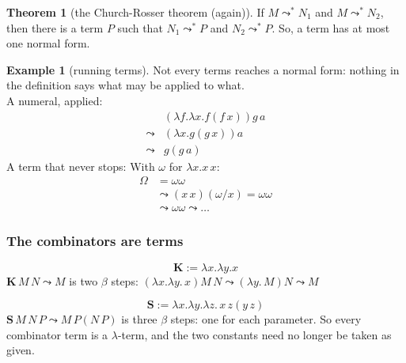 \documentclass[a4paper, 11pt]{article}
\theoremstyle{definition}
\newtheorem{example}[definition]{Example}
\newtheorem{theorem}[definition]{Theorem}
\begin{document}
\begin{theorem}[the Church-Rosser theorem (again)]
    If $M \leadsto^* N_1$ and $M \leadsto^* N_2$, then there is a term $P$ such that $N_1
    \leadsto^* P$ and $N_2 \leadsto^* P$. So, a term has at most one normal form.
\end{theorem}

\begin{example}[running terms]
    Not every terms reaches a normal form: nothing in the definition says what may be applied to what. \\
    A numeral, applied: 
    \begin{align*}
        &(\lambda f. \lambda x. f (f \, x)) g \, a \\
        \leadsto &(\lambda x. g(g \, x)) a \\
        \leadsto & g(g \, a)
    \end{align*}
    A term that never stops:
    With $\omega$ for $\lambda x. x \, x$:
    \begin{align*}
        \Omega &= \omega \omega \\
        &\leadsto (x \, x)(\omega/x) = \omega \omega \\
        &\leadsto \omega \omega \leadsto \dots
    \end{align*}
\end{example}

\subsubsection{The combinators are terms}
\[\textbf{K} := \lambda x. \lambda y. x\]
$\textbf{K}\,M\,N \leadsto M$ is two $\beta$ steps: $(\lambda x. \lambda y.\, x) M \, N \leadsto 
(\lambda y. \,M) N \leadsto M$

\[\textbf{S} := \lambda x. \lambda y. \lambda z. \, x \,z (y \, z)\]
$\textbf{S} \, M \, N \, P \leadsto M \, P (N \, P)$ is three $\beta$ steps: one for each parameter. So every
combinator term is a $\lambda$-term, and the two constants need no longer be taken as given.
\end{document}
